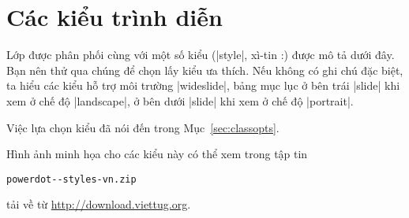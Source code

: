 \section{\texorpdfstring{Các kiểu trình diễn}{Cac kieu trinh dien}}
\label{sec:styles}

Lớp 
được phân phối cùng với một số kiểu (|style|, xì-tin :) được mô tả
dưới đây. Bạn nên thử qua chúng để chọn lấy kiểu ưa thích.
Nếu không có ghi chú đặc biệt, ta hiểu các kiểu hỗ trợ môi trường |wideslide|,
bảng mục lục ở bên trái |slide| khi xem ở chế độ |landscape|,
ở bên dưới |slide| khi xem ở chế độ |portrait|.

Việc lựa chọn kiểu đã nói đến trong Mục~\vref{sec:classopts}.

\medskip
Hình ảnh minh họa cho các kiểu này có thể xem trong tập tin\\
\centerline{\texttt{powerdot-\pdversion-styles-vn.zip}}
tải về từ \url{http://download.viettug.org}.

